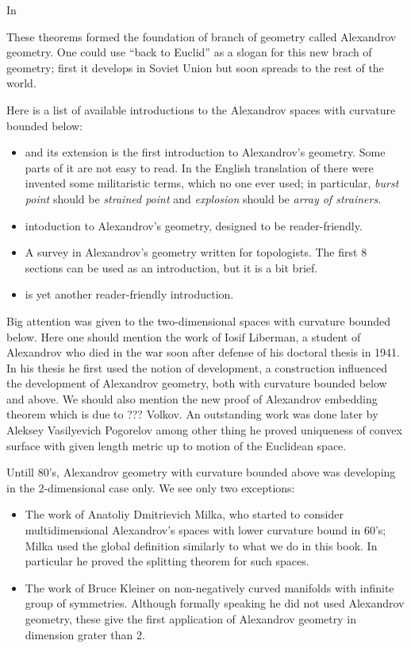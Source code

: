 In 

These theorems formed the foundation of branch of geometry called Alexandrov geometry.
One could use ``back to Euclid'' as a slogan for this new brach of geometry;
first it develops in Soviet Union but soon spreads to the rest of the world.

Here is a list of available introductions to the Alexandrov spaces with curvature bounded below: 
\begin{itemize}
\item \cite{BGP} and its extension \cite{perelman:spaces2} is the first introduction to Alexandrov's geometry. 
Some parts of it are not easy to read. 
In the English translation of \cite{BGP} there were invented some militaristic terms, which no one ever used;  in particular, \emph{burst point} should be \emph{strained point} and \emph{explosion} should be \emph{array of strainers}.
\item \cite{shiohama} intoduction to Alexandrov's geometry, designed to be reader-friendly. 
\item \cite{plaut:survey} A survey in Alexandrov's geometry 
written for topologists. 
The first 8 sections can be used as an introduction, but it is  a bit brief.
\item \cite[Chapter 10]{BBI} is yet another reader-friendly introduction.
\end{itemize}


Big attention was given to 
the two-dimensional spaces with curvature bounded below.
Here one should mention the work of Iosif Liberman,
a student of Alexandrov who died in the war soon after defense of his doctoral thesis in 1941.
In his thesis he first used the notion of development, 
a construction influenced the development of Alexandrov geometry, both with curvature bounded below and above.
We should also mention the new proof of Alexandrov embedding theorem which is due to ??? Volkov.
An outstanding work was done later by Aleksey Vasilyevich Pogorelov 
among other thing he proved uniqueness of convex surface with given length metric up to motion of the Euclidean space.

Untill 80's,
Alexandrov geometry with curvature bounded above
was developing in the 2-dimensional case only.
We see only two exceptions:
\begin{itemize}
\item The work of Anatoliy Dmitrievich Milka, 
who started to consider multidimensional Alexandrov's spaces with lower curvature bound in 60's;
Milka used the global definition similarly to what we do in this book.
In particular he proved the splitting theorem for such spaces.
\item The work of Bruce Kleiner on non-negatively curved manifolds with infinite group of symmetries.
Although
formally speaking he did not used Alexandrov geometry, these
give the first application of Alexandrov geometry in dimension grater than 2.
\end{itemize}

